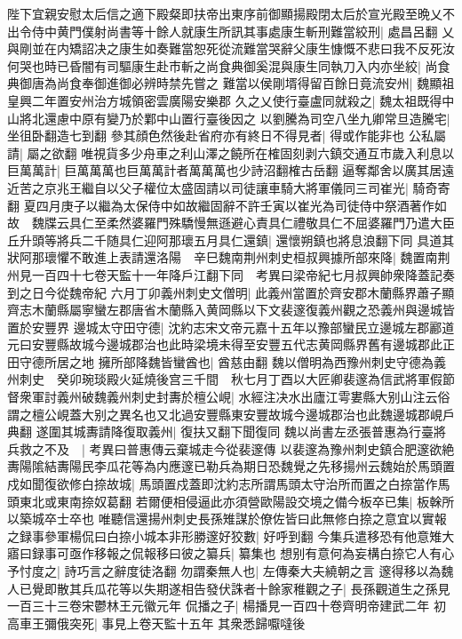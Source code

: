 陛下宜親安慰太后信之適下殿粲即扶帝出東序前御顯揚殿閉太后於宣光殿至晩乂不出令侍中黄門僕射尚書等十餘人就康生所訊其事處康生斬刑難當絞刑|{
	處昌呂翻}
乂與剛並在内矯詔决之康生如奏難當恕死從流難當哭辭父康生慷慨不悲曰我不反死汝何哭也時已昏闇有司驅康生赴市斬之尚食典御奚混與康生同執刀入内亦坐絞|{
	尚食典御唐為尚食奉御進御必辨時禁先嘗之}
難當以侯剛壻得留百餘日竟流安州|{
	魏顯祖皇興二年置安州治方城領密雲廣陽安樂郡}
久之乂使行臺盧同就殺之|{
	魏太祖既得中山將北還慮中原有變乃於鄴中山置行臺後因之}
以劉騰為司空八坐九卿常旦造騰宅|{
	坐徂卧翻造七到翻}
參其顔色然後赴省府亦有終日不得見者|{
	得或作能非也}
公私屬請|{
	屬之欲翻}
唯視貨多少舟車之利山澤之饒所在榷固刻剥六鎮交通互市歲入利息以巨萬萬計|{
	巨萬萬萬也巨萬萬計者萬萬萬也少詩沼翻榷古岳翻}
逼奪鄰舍以廣其居遠近苦之京兆王繼自以父子權位太盛固請以司徒讓車騎大將軍儀同三司崔光|{
	騎奇寄翻}
夏四月庚子以繼為太保侍中如故繼固辭不許壬寅以崔光為司徒侍中祭酒著作如故　魏牒云具仁至柔然婆羅門殊驕慢無遜避心責具仁禮敬具仁不屈婆羅門乃遣大臣丘升頭等將兵二千随具仁迎阿那瓌五月具仁還鎮|{
	還懷朔鎮也將息浪翻下同}
具道其狀阿那瓌懼不敢進上表請還洛陽　辛巳魏南荆州刺史桓叔興據所部來降|{
	魏置南荆州見一百四十七卷天監十一年降戶江翻下同　考異曰梁帝紀七月叔興帥衆降蓋記奏到之日今從魏帝紀}
六月丁卯義州刺史文僧明|{
	此義州當置於齊安郡木蘭縣界蕭子顯齊志木蘭縣屬寧蠻左郡唐省木蘭縣入黄岡縣以下文裴邃復義州觀之恐義州與邊城皆置於安豐界}
邊城太守田守德|{
	沈約志宋文帝元嘉十五年以豫部蠻民立邊城左郡酈道元曰安豐縣故城今邊城郡治也此時梁境未得至安豐五代志黄岡縣界舊有邊城郡此正田守德所居之地}
擁所部降魏皆蠻酋也|{
	酋慈由翻}
魏以僧明為西豫州刺史守德為義州刺史　癸卯琬琰殿火延燒後宫三千間　秋七月丁酉以大匠卿裴邃為信武將軍假節督衆軍討義州破魏義州刺史封夀於檀公峴|{
	水經注决水出廬江雩婁縣大别山注云俗謂之檀公峴蓋大别之異名也又北過安豐縣東安豐故城今邊城郡治也此魏邊城郡峴戶典翻}
遂圍其城夀請降復取義州|{
	復扶又翻下聞復同}
魏以尚書左丞張普惠為行臺將兵救之不及　|{
	考異曰普惠傳云棄城走今從裴邃傳}
以裴邃為豫州刺史鎮合肥邃欲絶夀陽隂結夀陽民李瓜花等為内應邃已勒兵為期日恐魏覺之先移揚州云魏始於馬頭置戍如聞復欲修白捺故城|{
	馬頭置戍蓋即沈約志所謂馬頭太守治所而置之白捺當作馬頭東北或東南捺奴葛翻}
若爾便相侵逼此亦須營歐陽設交境之備今板卒已集|{
	板榦所以築城卒士卒也}
唯聽信還揚州刺史長孫雉謀於僚佐皆曰此無修白捺之意宜以實報之録事參軍楊侃曰白捺小城本非形勝邃好狡數|{
	好呼到翻}
今集兵遣移恐有他意雉大寤曰録事可亟作移報之侃報移曰彼之纂兵|{
	纂集也}
想别有意何為妄構白捺它人有心予忖度之|{
	詩巧言之辭度徒洛翻}
勿謂秦無人也|{
	左傳秦大夫繞朝之言}
邃得移以為魏人已覺即散其兵瓜花等以失期遂相告發伏誅者十餘家稚觀之子|{
	長孫觀道生之孫見一百三十三卷宋鬱林王元徽元年}
侃播之子|{
	楊播見一百四十卷齊明帝建武二年}
初高車王彌俄突死|{
	事見上卷天監十五年}
其衆悉歸嚈噠後

